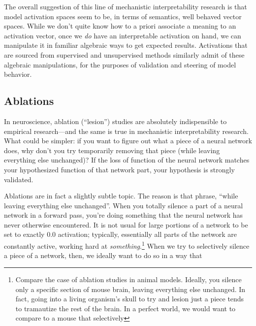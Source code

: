 The overall suggestion of this line of mechanistic interpretability research is
that model activation spaces seem to be, in terms of semantics, well behaved
vector spaces. While we don't quite know how to a priori associate a meaning to
an activation vector, once we \emph{do} have an interpretable activation on hand,
we can manipulate it in familiar algebraic ways to get expected results.
Activations that are sourced from supervised and unsupervised methods similarly
admit of these algebraic manipulations, for the purposes of validation and
steering of model behavior.


\subsection{Ablations}
In neuroscience, ablation (``lesion'') studies are absolutely indispensible to
empirical research---and the same is true in mechanistic interpretability
research. What could be simpler: if you want to figure out what a piece of a
neural network does, why don't you try temporarily removing that piece (while
leaving everything else unchanged)? If the loss of function of the neural
network matches your hypothesized function of that network part, your
hypothesis is strongly validated.

Ablations are in fact a slightly subtle topic. The reason is that phrase,
``while leaving everything else unchanged''. When you totally silence a part of
a neural network in a forward pass, you're doing something that the neural
network has never otherwise encountered. It is not usual for large portions of
a network to be set to exactly $0.0$ activation; typically, essentially all
parts of the network are constantly active, working hard at
\emph{something}.\footnote{Compare the case of ablation studies in animal
models. Ideally, you silence only a specific section of mouse brain, leaving
everything else unchanged. In fact, going into a living organism's skull to try
and lesion just a piece tends to tramautize the rest of the brain. In a perfect
world, we would want to compare to a mouse that selectively } When we try
to selectively silence a piece of a network, then, we ideally want to do so in
a way that 

